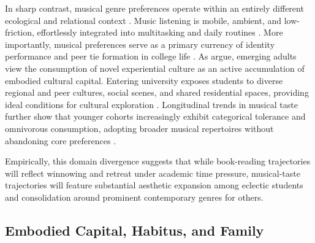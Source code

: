\documentclass[12pt]{article}
\begin{document}
In sharp contrast, musical genre preferences operate within an entirely different ecological and relational context \citep{lewis2018conversion}. Music listening is mobile, ambient, and low-friction, effortlessly integrated into multitasking and daily routines \citep{webster2020taste,rimmer2010listening, denora2000music-0f0}. More importantly, musical preferences serve as a primary currency of identity performance and peer tie formation in college life \citep{lewis2018conversion}. As \citet{weinberger2017consuming} argue, emerging adults view the consumption of novel experiential culture as an active accumulation of embodied cultural capital. Entering university exposes students to diverse regional and peer cultures, social scenes, and shared residential spaces, providing ideal conditions for cultural exploration \citep{gripsrud2011changing}. Longitudinal trends in musical taste further show that younger cohorts increasingly exhibit categorical tolerance and omnivorous consumption, adopting broader musical repertoires without abandoning core preferences \citep{lizardo2015musical-8c6,lizardo2016end-4fb, lizardo2026forward}.

Empirically, this domain divergence suggests that while book-reading trajectories will reflect winnowing and retreat under academic time pressure, musical-taste trajectories will feature substantial aesthetic expansion among eclectic students and consolidation around prominent contemporary genres for others.

\subsection{Embodied Capital, Habitus, and Family}
\end{document}

